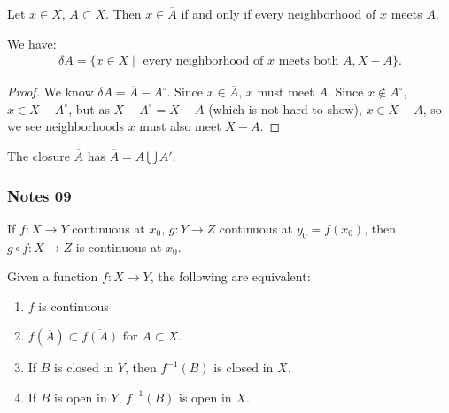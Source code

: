 \documentclass[12pt,letterpaper,reqno]{article}
\begin{document}
\begin{lemma}\label{lemma:neighborhood-condition-for-closures}
    Let $x \in X$, $A \subset X$. Then $x \in \overline{A}$ if and only if every neighborhood of $x$ meets $A$.
\end{lemma}

\begin{corollary}\label{corollary:boundary-in-terms-of-neighborhoods}
    We have:
    \begin{align*}
        \delta A= \{ x \in X \mid \text{ every neighborhood of $x$ meets both } A, X-A \}.
    \end{align*}
\end{corollary}

\begin{proof}
    We know $\delta A = \overline{A} - A^{\circ}$. Since $x \in \overline{A}$, $x$ must meet $A$. Since $x \notin A^{\circ}$, $x \in X-A^{\circ}$, but as $X-A^{\circ} = \overline{X-A}$ (which is not hard to show), $x \in \overline{X-A}$, so we see neighborhoods $x$ must also meet $X-A$.
\end{proof}

\begin{corollary}\label{corollary:closure-is-accumulation-pts-with-all-of-A}
    The closure $\overline{A}$ has $\overline{A} = A \bigcup A'$.
\end{corollary}

\subsubsection{Notes 09}

\begin{lemma}\label{lemma:composition-continuous}
    If $f: X \to Y$ continuous at $x_0$, $g: Y \to Z$ continuous at $y_0 = f(x_0)$, then $g \circ f : X \to Z$ is continuous at $x_0$.
\end{lemma}

\begin{theorem}\label{theorem:characterization-of-continuity}
    Given a function $f: X \to Y$, the following are equivalent:
    \begin{enumerate}
        \item $f$ is continuous
        \item $f(\overline{A}) \subset \overline{f(A)}$ for $A \subset X$.
        \item If $B$ is closed in $Y$, then $f^{-1}(B)$ is closed in $X$.
        \item If $B$ is open in $Y$, $f^{-1}(B)$ is open in $X$.
    \end{enumerate}
\end{theorem}
\end{document}
